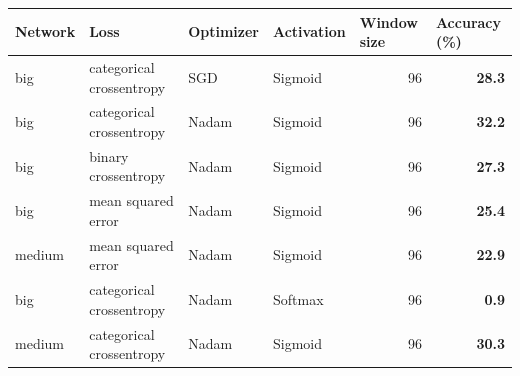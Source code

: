 \documentclass[11pt, twocolumn]{article}
\begin{document}
\begin{table}[]
    \centering
    \begin{tabular}{@{}llllrr@{}}
        \toprule
        \textbf{Network}               & \textbf{Loss}                               & \textbf{Optimizer}            & \textbf{Activation}             & \multicolumn{1}{l}{\textbf{Window size}}                                & \multicolumn{1}{l}{\textbf{Accuracy (\%)}} \\ \midrule
        big                            & categorical crossentropy                    & SGD                           & Sigmoid                         & \multicolumn{1}{r|}{96}                                                 & \textbf{28.3}                              \\
        big                            & categorical crossentropy                    & \cellcolor[HTML]{9AFF99}Nadam & Sigmoid                         & \multicolumn{1}{r|}{96}                                                 & \textbf{32.2}                              \\
        big                            & \cellcolor[HTML]{FFCCC9}binary crossentropy & Nadam                         & Sigmoid                         & \multicolumn{1}{r|}{96}                                                 & \textbf{27.3}                              \\
        big                            & \cellcolor[HTML]{FFCCC9}mean squared error  & Nadam                         & Sigmoid                         & \multicolumn{1}{r|}{96}                                                 & \textbf{25.4}                              \\
        \cellcolor[HTML]{FFCCC9}medium & mean squared error                          & Nadam                         & Sigmoid                         & \multicolumn{1}{r|}{96}                                                 & \textbf{22.9}                              \\
        big                            & categorical crossentropy                    & Nadam                         & \cellcolor[HTML]{FFCCC9}Softmax & \multicolumn{1}{r|}{96}                                                 & \textbf{0.9}                               \\
        \cellcolor[HTML]{FFCCC9}medium & categorical crossentropy                    & Nadam                         & Sigmoid                         & \multicolumn{1}{r|}{96}                                                 & \textbf{30.3}                              \\

\end{tabular}
\end{table}
\end{document}
